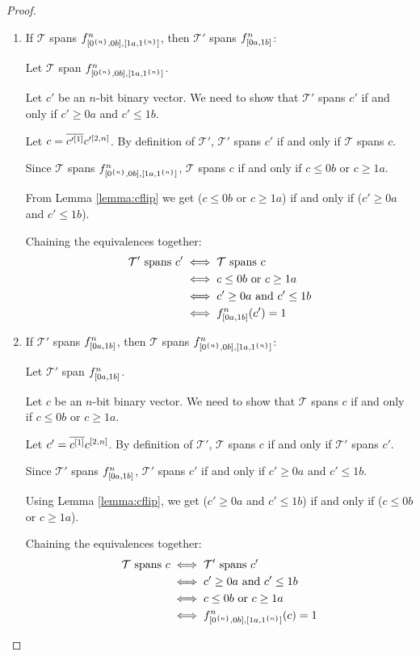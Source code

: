 \begin{proof}
\hfill %
\begin{enumerate}
\item
If $\mathcal{T}$ spans $f^{n}_{[0^{\{n\}}, 0 b], [1 a, 1^{\{n\}}]}$,
then $\mathcal{T}'$ spans $f^{n}_{[0 a, 1 b]}$:

Let $\mathcal{T}$ span $f^{n}_{[0^{\{n\}}, 0 b], [1 a, 1^{\{n\}}]}$.

Let $c'$ be an $n$-bit binary vector.
We need to show that
$\mathcal{T}'$ spans $c'$
if and only if
$c' \geq 0 a$ and $c' \leq 1 b$.

Let $c = \overline{c'^{[1]}} c'^{[2, n]}$.
By definition of $\mathcal{T}'$,
$\mathcal{T}'$ spans $c'$
if and only if
$\mathcal{T}$ spans $c$.

Since $\mathcal{T}$ spans
$f^{n}_{[0^{\{n\}}, 0 b], [1 a, 1^{\{n\}}]}$,
$\mathcal{T}$ spans $c$
if and only if
$c \leq 0 b$ or $c \geq 1 a$.

From Lemma \ref{lemma:cflip}
we get ($c \leq 0 b$ or $c \geq 1 a$)
if and only if
($c' \geq 0 a$ and $c' \leq 1 b$).

Chaining the equivalences together:
\begin{align*}
\mathcal{T}' \text{ spans } c' &\iff \mathcal{T} \text{ spans } c \\
&\iff c \leq 0 b \text{ or } c \geq 1 a \\
&\iff c' \geq 0 a \text{ and } c' \leq 1 b \\
&\iff f^{n}_{[0 a, 1 b]}(c') = 1
\end{align*}

\item
If $\mathcal{T}'$ spans $f^{n}_{[0 a, 1 b]}$,
then $\mathcal{T}$ spans $f^{n}_{[0^{\{n\}}, 0 b], [1 a, 1^{\{n\}}]}$:

Let $\mathcal{T}'$ span $f^{n}_{[0 a, 1 b]}$.

Let $c$ be an $n$-bit binary vector.
We need to show that $\mathcal{T}$ spans $c$
if and only if
$c \leq 0 b$ or $c \geq 1 a$.

Let $c' = \overline{c^{[1]}} c^{[2, n]}$.
By definition of $\mathcal{T}'$,
$\mathcal{T}$ spans $c$
if and only if
$\mathcal{T}'$ spans $c'$.

Since $\mathcal{T}'$ spans $f^{n}_{[0 a, 1 b]}$,
$\mathcal{T}'$ spans $c'$
if and only if
$c' \geq 0 a$ and $c' \leq 1 b$.

Using Lemma \ref{lemma:cflip},
we get
($c' \geq 0 a$ and $c' \leq 1 b$)
if and only if
($c \leq 0 b$ or $c \geq 1 a$).

Chaining the equivalences together:
\begin{align*}
\mathcal{T} \text{ spans } c
&\iff \mathcal{T}' \text{ spans } c' \\
&\iff c' \geq 0 a \text{ and } c' \leq 1 b \\
&\iff c \leq 0 b \text{ or } c \geq 1 a \\
&\iff f^{n}_{[0^{\{n\}}, 0 b], [1 a, 1^{\{n\}}]}(c) = 1
\end{align*}

\end{enumerate}
\end{proof}

